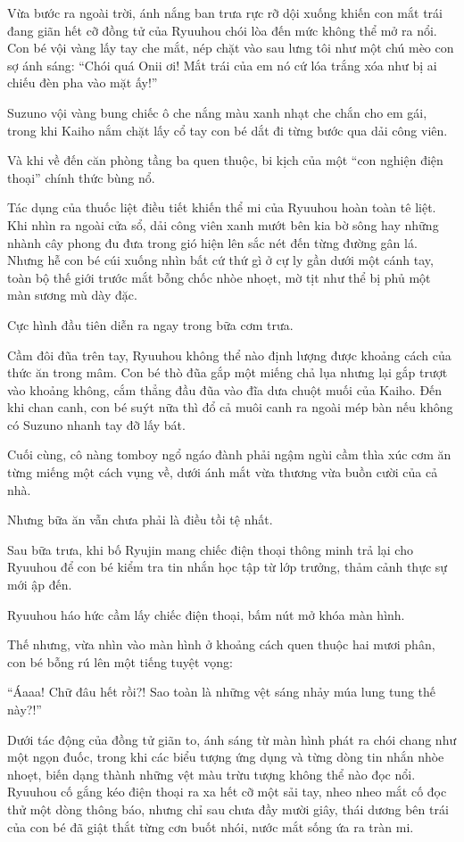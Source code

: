 ﻿\documentclass[../main.tex]{subfiles}
\begin{document}
Vừa bước ra ngoài trời, ánh nắng ban trưa rực rỡ dội xuống khiến con mắt trái đang giãn hết cỡ đồng tử của Ryuuhou chói lòa đến mức không thể mở ra nổi. Con bé vội vàng lấy tay che mắt, nép chặt vào sau lưng tôi như một chú mèo con sợ ánh sáng: ``Chói quá Onii ơi! Mắt trái của em nó cứ lóa trắng xóa như bị ai chiếu đèn pha vào mặt ấy!''

Suzuno vội vàng bung chiếc ô che nắng màu xanh nhạt che chắn cho em gái, trong khi Kaiho nắm chặt lấy cổ tay con bé dắt đi từng bước qua dải công viên.

Và khi về đến căn phòng tầng ba quen thuộc, bi kịch của một ``con nghiện điện thoại'' chính thức bùng nổ.

Tác dụng của thuốc liệt điều tiết khiến thể mi của Ryuuhou hoàn toàn tê liệt. Khi nhìn ra ngoài cửa sổ, dải công viên xanh mướt bên kia bờ sông hay những nhành cây phong đu đưa trong gió hiện lên sắc nét đến từng đường gân lá. Nhưng hễ con bé cúi xuống nhìn bất cứ thứ gì ở cự ly gần dưới một cánh tay, toàn bộ thế giới trước mắt bỗng chốc nhòe nhoẹt, mờ tịt như thể bị phủ một màn sương mù dày đặc.

Cực hình đầu tiên diễn ra ngay trong bữa cơm trưa.

Cầm đôi đũa trên tay, Ryuuhou không thể nào định lượng được khoảng cách của thức ăn trong mâm. Con bé thò đũa gắp một miếng chả lụa nhưng lại gắp trượt vào khoảng không, cắm thẳng đầu đũa vào đĩa dưa chuột muối của Kaiho. Đến khi chan canh, con bé suýt nữa thì đổ cả muôi canh ra ngoài mép bàn nếu không có Suzuno nhanh tay đỡ lấy bát.

Cuối cùng, cô nàng tomboy ngổ ngáo đành phải ngậm ngùi cầm thìa xúc cơm ăn từng miếng một cách vụng về, dưới ánh mắt vừa thương vừa buồn cười của cả nhà.

Nhưng bữa ăn vẫn chưa phải là điều tồi tệ nhất.

Sau bữa trưa, khi bố Ryujin mang chiếc điện thoại thông minh trả lại cho Ryuuhou để con bé kiểm tra tin nhắn học tập từ lớp trưởng, thảm cảnh thực sự mới ập đến.

Ryuuhou háo hức cầm lấy chiếc điện thoại, bấm nút mở khóa màn hình.

Thế nhưng, vừa nhìn vào màn hình ở khoảng cách quen thuộc hai mươi phân, con bé bỗng rú lên một tiếng tuyệt vọng:

``Áaaa! Chữ đâu hết rồi?! Sao toàn là những vệt sáng nhảy múa lung tung thế này?!''

Dưới tác động của đồng tử giãn to, ánh sáng từ màn hình phát ra chói chang như một ngọn đuốc, trong khi các biểu tượng ứng dụng và từng dòng tin nhắn nhòe nhoẹt, biến dạng thành những vệt màu trừu tượng không thể nào đọc nổi. Ryuuhou cố gắng kéo điện thoại ra xa hết cỡ một sải tay, nheo nheo mắt cố đọc thử một dòng thông báo, nhưng chỉ sau chưa đầy mười giây, thái dương bên trái của con bé đã giật thắt từng cơn buốt nhói, nước mắt sống ứa ra tràn mi.
\end{document}

